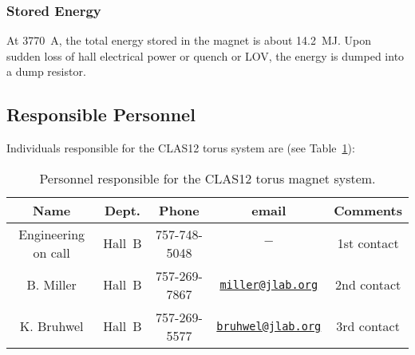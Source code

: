 \subsubsection{Stored Energy}

At 3770~A, the total energy stored in the magnet is about 14.2~MJ. Upon sudden loss of hall 
electrical power or quench or LOV, the energy is dumped into a dump resistor.

\subsection{Responsible Personnel}

Individuals responsible for the CLAS12 torus system are (see Table~\ref{tb:torus}):

\begin{table}[!htb]
\centering
\begin{tabular}{|c|c|c|c|c|} \hline
Name       & Dept.  & Phone&email&Comments \\ \hline
Engineering on call & Hall~B &757-748-5048&$-$& 1st contact \\ \hline
B. Miller  & Hall~B & 757-269-7867&\href{mailto:miller@jlab.org}{\nolinkurl{miller@jlab.org}}&2nd contact\\ \hline
K. Bruhwel & Hall~B & 757-269-5577&\href{mailto:}{\nolinkurl{bruhwel@jlab.org}}&3rd contact \\ \hline
\end{tabular}
\caption{Personnel responsible for the CLAS12 torus magnet system.} 
\label{tb:torus}
\end{table}

